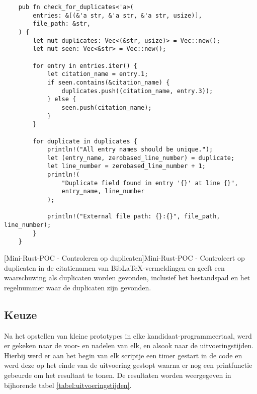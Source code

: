 \begin{verbatim}
    pub fn check_for_duplicates<'a>(
        entries: &[(&'a str, &'a str, &'a str, usize)],
        file_path: &str,
    ) {
        let mut duplicates: Vec<(&str, usize)> = Vec::new();
        let mut seen: Vec<&str> = Vec::new();

        for entry in entries.iter() {
            let citation_name = entry.1;
            if seen.contains(&citation_name) {
                duplicates.push((citation_name, entry.3));
            } else {
                seen.push(citation_name);
            }
        }

        for duplicate in duplicates {
            println!("All entry names should be unique.");
            let (entry_name, zerobased_line_number) = duplicate;
            let line_number = zerobased_line_number + 1;
            println!(
                "Duplicate field found in entry '{}' at line {}",
                entry_name, line_number
            );

            println!("External file path: {}:{}", file_path, line_number);
        }
    }
\end{verbatim}
[Mini-Rust-\acrshort{POC} - Controleren op duplicaten]{Mini-Rust-\acrshort{POC} - Controleert op duplicaten in de citatienamen van BibLaTeX-vermeldingen en geeft een waarschuwing als duplicaten worden gevonden, inclusief het bestandspad en het regelnummer waar de duplicaten zijn gevonden. \label{lst:mini_rust_poc_check_duplicates}}

\pagebreak

\subsection{Keuze}
Na het opstellen van kleine prototypes in elke kandidaat-programmeertaal, werd er gekeken naar de voor- en nadelen van elk, en alsook naar de uitvoeringstijden. Hierbij werd er aan het begin van elk scriptje een timer gestart in de code en werd deze op het einde van de uitvoering gestopt waarna er nog een printfunctie gebeurde om het resultaat te tonen. De resultaten worden weergegeven in bijhorende tabel \ref{tabel:uitvoeringstijden}.

